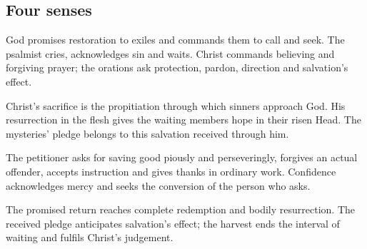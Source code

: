 \subsection{Four senses}
\begin{fourSenses}
\item[Literal.] God promises restoration to exiles and commands them to
call and seek. The psalmist cries, acknowledges sin and waits. Christ
commands believing and forgiving prayer; the orations ask protection,
pardon, direction and salvation's effect.
\item[Allegorical.] Christ's sacrifice is the propitiation through which
sinners approach God. His resurrection in the flesh gives the waiting
members hope in their risen Head. The mysteries' pledge belongs to
this salvation received through him.
\item[Moral.] The petitioner asks for saving good piously and perseveringly,
forgives an actual offender, accepts instruction and gives thanks in
ordinary work. Confidence acknowledges mercy and seeks the conversion
of the person who asks.
\item[Anagogical.] The promised return reaches complete redemption and
bodily resurrection. The received pledge anticipates salvation's effect;
the harvest ends the interval of waiting and fulfils Christ's judgement.
\end{fourSenses}
